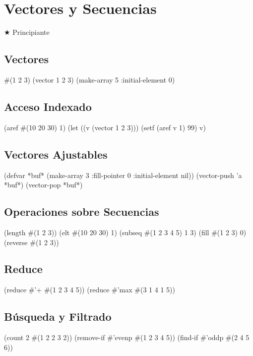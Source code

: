 \chapter{Vectores y Secuencias}
\label{chap:vectors}
{\huge$\bigstar$} Principiante

\section{Vectores}
\begin{lispcode}
#(1 2 3)
(vector 1 2 3)
(make-array 5 :initial-element 0)
\end{lispcode}

\section{Acceso Indexado}
\begin{lispcode}
(aref #(10 20 30) 1)
(let ((v (vector 1 2 3))) (setf (aref v 1) 99) v)
\end{lispcode}

\section{Vectores Ajustables}
\begin{lispcode}
(defvar *buf* (make-array 3 :fill-pointer 0 :initial-element nil))
(vector-push 'a *buf*)
(vector-pop *buf*)
\end{lispcode}

\section{Operaciones sobre Secuencias}
\begin{lispcode}
(length #(1 2 3))
(elt #(10 20 30) 1)
(subseq #(1 2 3 4 5) 1 3)
(fill #(1 2 3) 0)
(reverse #(1 2 3))
\end{lispcode}

\section{Reduce}
\begin{lispcode}
(reduce #'+ #(1 2 3 4 5))
(reduce #'max #(3 1 4 1 5))
\end{lispcode}

\section{Búsqueda y Filtrado}
\begin{lispcode}
(count 2 #(1 2 2 3 2))
(remove-if #'evenp #(1 2 3 4 5))
(find-if #'oddp #(2 4 5 6))
\end{lispcode}

